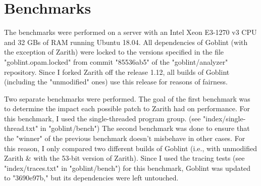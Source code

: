 \documentclass{scrartcl}
\begin{document}
\appendix

\section{Benchmarks}
\label{sec:bench}

The benchmarks were performed on a server with an Intel Xeon E3-1270 v3 CPU and 32 GBs of RAM running Ubuntu 18.04. All dependencies of Goblint (with the exception of Zarith) were locked to the versions specified in the file "goblint.opam.locked" from commit "85536ab5" of the "goblint/analyzer" repository. Since I forked Zarith off the release 1.12, all builds of Goblint (including the "unmodified" ones) use this release for reasons of fairness.

Two separate benchmarks were performed. The goal of the first benchmark was to determine the impact each possible patch to Zarith had on performance. For this benchmark, I used the single-threaded program group. (see "index/single-thread.txt" in "goblint/bench") The second benchmark was done to ensure that the "winner" of the previous benchmark doesn't misbehave in other cases. For this reason, I only compared two different builds of Goblint (i.e., with unmodified Zarith \& with the 53-bit version of Zarith). Since I used the tracing tests (see "index/traces.txt" in "goblint/bench") for this benchmark, Goblint was updated to "3690e97b," but its dependencies were left untouched.
\end{document}
